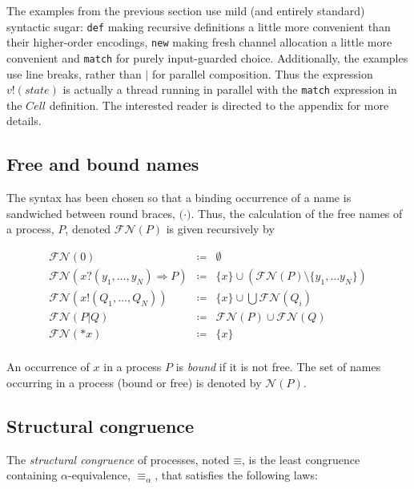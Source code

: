 \documentclass[]{amsart}
\newcommand{\id}[1]{\texttt{#1}}
\newcommand{\pzero}{\mathbin{0}}
\newcommand{\juxtap}{\mathbin{\id{|}}}
\newcommand{\scong}{\mathbin{\equiv}}
\newcommand{\alphaeq}{\mathbin{\equiv_{\alpha}}}
\newcommand{\names}[1]{\mathbin{\mathcal{N}(#1)}}
\newcommand{\freenames}[1]{\mathbin{\mathcal{FN}(#1)}}
\newcommand{\binpar}[2]{#1 \juxtap #2}
\newcommand{\defneqls}{\coloneqq}
\theoremstyle{definition}
\theoremstyle{remark}
\numberwithin{equation}{subsection}
\begin{document}
The examples from the previous section use mild (and entirely
standard) syntactic sugar: \texttt{def} making recursive definitions a
little more convenient than their higher-order encodings, \texttt{new}
making fresh channel allocation a little more convenient and
\texttt{match} for purely input-guarded choice. Additionally, the
examples use line breaks, rather than $\binpar{}{}$ for parallel
composition. Thus the expression $v!( state )$ is actually a thread
running in parallel with the \texttt{match} expression in the $Cell$
definition. The interested reader is directed to the appendix for more
details.

\subsection{Free and bound names}

The syntax has been chosen so that a binding occurrence of a name is
sandwiched between round braces, ${(} \cdot {)}$. Thus, the
calculation of the free names of a process, $P$, denoted
$\freenames{P}$ is given recursively by

	\begin{eqnarray*}
		\freenames{\pzero} & \defneqls & \emptyset \\
		\freenames{{x}{?}{( y_1, \ldots, y_N )} \Rightarrow {P}} & \defneqls & \{ x \} \cup (\freenames{P} \setminus \{ y_1, \ldots y_N \}) \\
		\freenames{{x}{!}{( Q_1, \ldots, Q_N )}} & \defneqls & \{ x \} \cup \bigcup \freenames{Q_i} \\
		\freenames{\binpar{P}{Q}} & \defneqls & \freenames{P} \cup \freenames{Q} \\
		\freenames{{*}{x}} & \defneqls & \{ x \} \\
	\end{eqnarray*}

An occurrence of $x$ in a process $P$ is \textit{bound} if it is not
free. The set of names occurring in a process (bound or free) is
denoted by $\names{P}$.

\subsection{Structural congruence}

The {\em structural congruence} of processes, noted $\scong$, is the
least congruence containing $\alpha$-equivalence, $\alphaeq$, that
satisfies the following laws:
\end{document}
